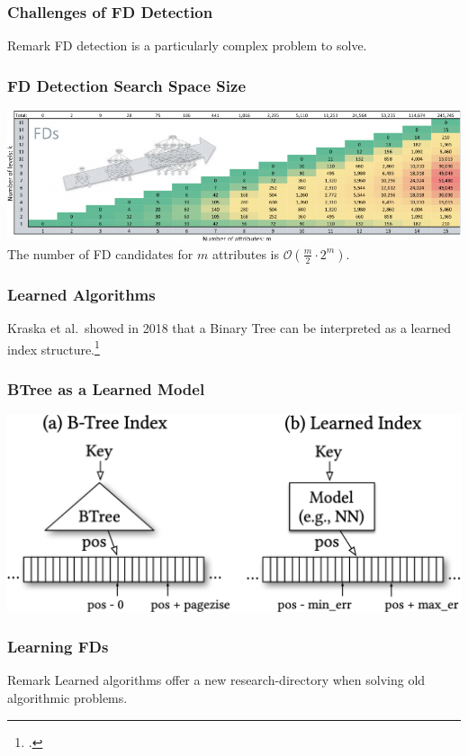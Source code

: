 \documentclass{beamer}
\begin{document}
\begin{frame}
    \frametitle{Challenges of FD Detection}
    \begin{block}{Remark}
        FD detection is a particularly complex problem to solve.
    \end{block}
\end{frame}

\begin{frame}
    \frametitle{FD Detection Search Space Size}
    \includegraphics[width=\textwidth]{fd_detection_complexity}
    \newline
    \vspace*{0.3 cm}
    \newline
    The number of FD candidates for $m$ attributes is $\mathcal{O}(\frac{m}{2} \cdot 2^m)$.
\end{frame}

\begin{frame}
    \frametitle{Learned Algorithms}
    Kraska et al.\ showed in 2018 that a Binary Tree can be interpreted
    as a learned index structure.\footcite{KRA18}
\end{frame}

\begin{frame}
    \frametitle{BTree as a Learned Model}
    \includegraphics[width=\textwidth]{btree_as_model}
\end{frame}

\begin{frame}
    \frametitle{Learning FDs}
    \begin{block}{Remark}
        Learned algorithms offer a new research-directory when solving old algorithmic problems.
    \end{block}
\end{frame}
\end{document}
